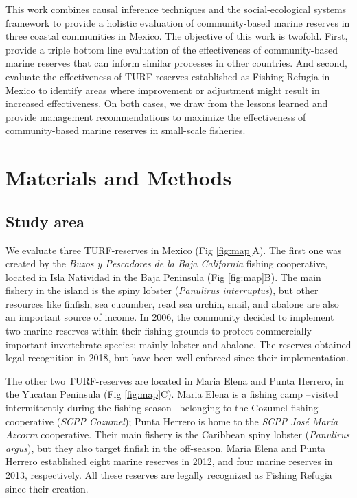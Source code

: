 \documentclass{frontiersSCNS}
\begin{document}
This work combines causal inference techniques and the social-ecological
systems framework to provide a holistic evaluation of community-based
marine reserves in three coastal communities in Mexico. The objective of
this work is twofold. First, provide a triple bottom line evaluation of
the effectiveness of community-based marine reserves that can inform
similar processes in other countries. And second, evaluate the
effectiveness of TURF-reserves established as Fishing Refugia in Mexico
to identify areas where improvement or adjustment might result in
increased effectiveness. On both cases, we draw from the lessons learned
and provide management recommendations to maximize the effectiveness of
community-based marine reserves in small-scale fisheries.

\section{Materials and Methods}\label{materials-and-methods}

\subsection{Study area}\label{study-area}

We evaluate three TURF-reserves in Mexico (Fig \ref{fig:map}A). The
first one was created by the \emph{Buzos y Pescadores de la Baja
California} fishing cooperative, located in Isla Natividad in the Baja
Peninsula (Fig \ref{fig:map}B). The main fishery in the island is the
spiny lobster (\emph{Panulirus interruptus}), but other resources like
finfish, sea cucumber, read sea urchin, snail, and abalone are also an
important source of income. In 2006, the community decided to implement
two marine reserves within their fishing grounds to protect commercially
important invertebrate species; mainly lobster and abalone. The reserves
obtained legal recognition in 2018, but have been well enforced since
their implementation.

The other two TURF-reserves are located in Maria Elena and Punta
Herrero, in the Yucatan Peninsula (Fig \ref{fig:map}C). Maria Elena is a
fishing camp --visited intermittently during the fishing season--
belonging to the Cozumel fishing cooperative (\emph{SCPP Cozumel});
Punta Herrero is home to the \emph{SCPP José María Azcorra} cooperative.
Their main fishery is the Caribbean spiny lobster (\emph{Panulirus
argus}), but they also target finfish in the off-season. Maria Elena and
Punta Herrero established eight marine reserves in 2012, and four marine
reserves in 2013, respectively. All these reserves are legally
recognized as Fishing Refugia since their creation.
\end{document}
